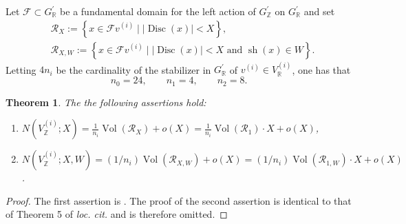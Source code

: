 \documentclass[table]{amsart}
\newtheorem{theorem}{Theorem}[section]
\newcommand{\op}[1]{\operatorname{#1}}
\numberwithin{equation}{section}
\begin{document}
Let $\mathcal{F} \subset G_{\mathbb{R}}^{\prime}$ be a fundamental domain for the left action of $G_{\mathbb{Z}}^{\prime}$ on $G_{\mathbb{R}}^{\prime}$ and set 
\[\begin{split}
    &\mathcal{R}_{X}:=\left\{x \in \mathcal{F} v^{(i)}\mid |\operatorname{Disc}(x)|<X\right\},\\
    &\mathcal{R}_{X, W}:=\left\{x \in \mathcal{F} v^{(i)}\mid |\operatorname{Disc}(x)|<X\text{ and }\op{sh}(x)\in W\right\}.
\end{split}\]
Letting $4 n_{i}$ be the cardinality of the stabilizer in $G_{\mathbb{R}}^{\prime}$ of $v^{(i)} \in V_{\mathbb{R}}^{(i)}$, one has that\[
n_0 = 24, \qquad n_1 = 4, \qquad n_2 = 8.
\]
\begin{theorem}
    The the following assertions hold:
    \begin{enumerate}
        \item $N\left(V_{\mathbb{Z}}^{(i)} ; X\right)=\frac{1}{n_{i}} \operatorname{Vol}\left(\mathcal{R}_{X}\right)+o(X)=\frac{1}{n_{i}} \operatorname{Vol}\left(\mathcal{R}_{1}\right) \cdot X+o(X)$,
        \item $N\left(V_{\mathbb{Z}}^{(i)} ; X, W\right)=\left(1 / n_{i}\right) \operatorname{Vol}\left(\mathcal{R}_{X, W}\right)+o(X)=\left(1 / n_{i}\right) \operatorname{Vol}\left(\mathcal{R}_{1, W}\right) \cdot X+o(X)$.
    \end{enumerate}
\end{theorem}
\begin{proof}
    The first assertion is \cite[Theorem 4]{bhargavaharron}. The proof of the second assertion is identical to that of Theorem 5 of \emph{loc. cit.} and is therefore omitted.
\end{proof}
\end{document}
